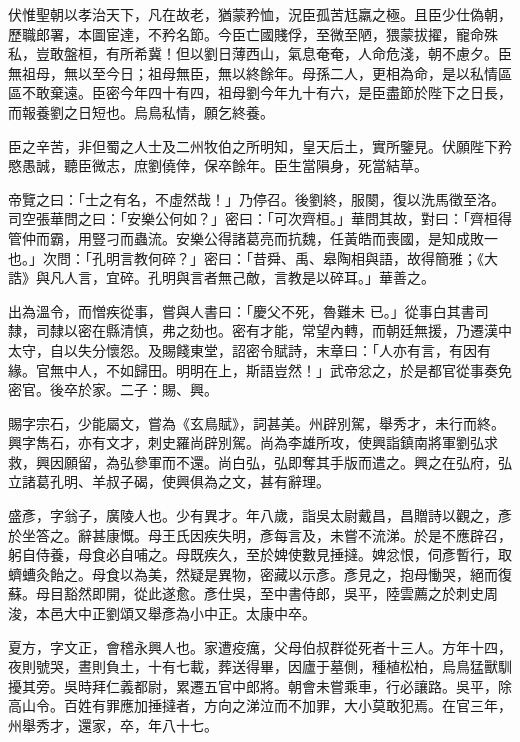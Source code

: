 \begin{pinyinscope}
 伏惟聖朝以孝治天下，凡在故老，猶蒙矜恤，況臣孤苦尪羸之極。且臣少仕偽朝，歷職郎署，本圖宦達，不矜名節。今臣亡國賤俘，至微至陋，猥蒙拔擢，寵命殊私，豈敢盤桓，有所希冀！但以劉日薄西山，氣息奄奄，人命危淺，朝不慮夕。臣無祖母，無以至今日；祖母無臣，無以終餘年。母孫二人，更相為命，是以私情區區不敢棄遠。臣密今年四十有四，祖母劉今年九十有六，是臣盡節於陛下之日長，而報養劉之日短也。烏鳥私情，願乞終養。



 臣之辛苦，非但蜀之人士及二州牧伯之所明知，皇天后土，實所鑒見。伏願陛下矜愍愚誠，聽臣微志，庶劉僥倖，保卒餘年。臣生當隕身，死當結草。



 帝覽之曰：「士之有名，不虛然哉！」乃停召。後劉終，服闋，復以洗馬徵至洛。司空張華問之曰：「安樂公何如？」密曰：「可次齊桓。」華問其故，對曰：「齊桓得管仲而霸，用豎刁而蟲流。安樂公得諸葛亮而抗魏，任黃皓而喪國，是知成敗一也。」次問：「孔明言教何碎？」密曰：「昔舜、禹、皋陶相與語，故得簡雅；《大誥》與凡人言，宜碎。孔明與言者無己敵，言教是以碎耳。」華善之。



 出為溫令，而憎疾從事，嘗與人書曰：「慶父不死，魯難未
 已。」從事白其書司隸，司隸以密在縣清慎，弗之劾也。密有才能，常望內轉，而朝廷無援，乃遷漢中太守，自以失分懷怨。及賜餞東堂，詔密令賦詩，末章曰：「人亦有言，有因有緣。官無中人，不如歸田。明明在上，斯語豈然！」武帝忿之，於是都官從事奏免密官。後卒於家。二子：賜、興。



 賜字宗石，少能屬文，嘗為《玄鳥賦》，詞甚美。州辟別駕，舉秀才，未行而終。興字雋石，亦有文才，刺史羅尚辟別駕。尚為李雄所攻，使興詣鎮南將軍劉弘求救，興因願留，為弘參軍而不還。尚白弘，弘即奪其手版而遣之。興之在弘府，弘立諸葛孔明、羊叔子碣，使興俱為之文，甚有辭理。



 盛彥，字翁子，廣陵人也。少有異才。年八歲，詣吳太尉戴昌，昌贈詩以觀之，彥於坐答之。辭甚康慨。母王氏因疾失明，彥每言及，未嘗不流涕。於是不應辟召，躬自侍養，母食必自哺之。母既疾久，至於婢使數見捶撻。婢忿恨，伺彥暫行，取蠐螬灸飴之。母食以為美，然疑是異物，密藏以示彥。彥見之，抱母慟哭，絕而復蘇。母目豁然即開，從此遂愈。彥仕吳，至中書侍郎，吳平，陸雲薦之於刺史周浚，本邑大中正劉頌又舉彥為小中正。太康中卒。



 夏方，字文正，會稽永興人也。家遭疫癘，父母伯叔群從死者十三人。方年十四，夜則號哭，晝則負土，十有七載，葬送得畢，因廬于墓側，種植松柏，烏鳥猛獸馴擾其旁。吳時拜仁義都尉，累遷五官中郎將。朝會未嘗乘車，行必讓路。吳平，除高山令。百姓有罪應加捶撻者，方向之涕泣而不加罪，大小莫敢犯焉。在官三年，州舉秀才，還家，卒，年八十七。




\end{pinyinscope}
